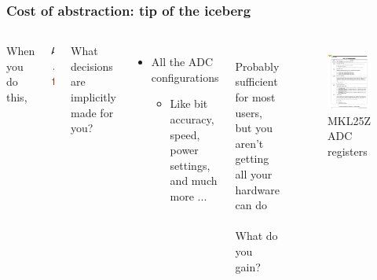 \documentclass{beamer}
\begin{document}
\begin{frame}[fragile]
\frametitle{Cost of abstraction: tip of the iceberg}
\begin{columns}[t]
When you do this,
\begin{lstlisting}[language=C++,basicstyle=\ttfamily\tiny]
AnalogIn my_adc(PTC2);
...
float adc_val = my_adc;
\end{lstlisting}
What decisions are implicitly made for you? \\
 {
\begin{itemize}
  \item All the ADC configurations
  \begin{itemize}
    \item Like bit accuracy, speed, power settings, and much more ...
  \end{itemize}
\end{itemize}
\hfill \\
Probably sufficient for most users, but you aren't getting all your hardware can do \\
\hfill \\
What do you gain?
}
 {
\begin{figure}[h!]
\includegraphics[width=\columnwidth]{external/mkl25z-adccfg1} \\
MKL25Z ADC registers
\end{figure}
}
\end{columns}
\end{frame}
\end{document}
